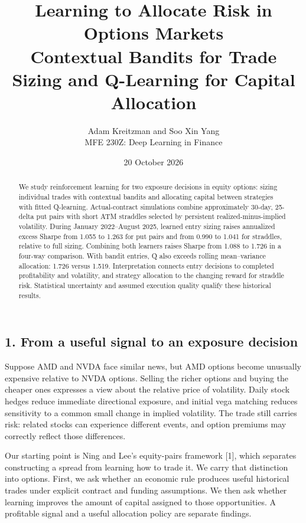 \documentclass[11pt,letterpaper]{article}
\title{\textbf{Learning to Allocate Risk in Options Markets}\\[0.4em]\large Contextual Bandits for Trade Sizing and Q-Learning for Capital Allocation}
\author{Adam Kreitzman and Soo Xin Yang\\MFE 230Z: Deep Learning in Finance}
\date{20 October 2026}
\begin{document}
\maketitle
\begin{abstract}
We study reinforcement learning for two exposure decisions in equity options: sizing individual trades with contextual bandits and allocating capital between strategies with fitted Q-learning. Actual-contract simulations combine approximately 30-day, 25-delta put pairs with short ATM straddles selected by persistent realized-minus-implied volatility. During January 2022--August 2025, learned entry sizing raises annualized excess Sharpe from 1.055 to 1.263 for put pairs and from 0.990 to 1.041 for straddles, relative to full sizing. Combining both learners raises Sharpe from 1.088 to 1.726 in a four-way comparison. With bandit entries, Q also exceeds rolling mean--variance allocation: 1.726 versus 1.519. Interpretation connects entry decisions to completed profitability and volatility, and strategy allocation to the changing reward for straddle risk. Statistical uncertainty and assumed execution quality qualify these historical results.

\end{abstract}
\subsection*{1. From a useful signal to an exposure decision}
Suppose AMD and NVDA face similar news, but AMD options become unusually expensive relative to NVDA options. Selling the richer options and buying the cheaper ones expresses a view about the relative price of volatility. Daily stock hedges reduce immediate directional exposure, and initial vega matching reduces sensitivity to a common small change in implied volatility. The trade still carries risk: related stocks can experience different events, and option premiums may correctly reflect those differences.

Our starting point is Ning and Lee's equity-pairs framework [1], which separates constructing a spread from learning how to trade it. We carry that distinction into options. First, we ask whether an economic rule produces useful historical trades under explicit contract and funding assumptions. We then ask whether learning improves the amount of capital assigned to those opportunities. A profitable signal and a useful allocation policy are separate findings.
\end{document}
